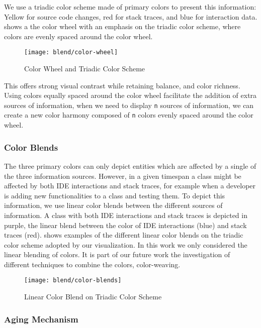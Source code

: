 We use a triadic color scheme made of primary colors to present this information: Yellow for source code changes, red for stack traces, and blue for interaction data.
 shows a the color wheel with an emphasis on the triadic color scheme, where colors are evenly spaced around the color wheel.

\begin{figure}[ht]
\centering
\texttt{[image: blend/color-wheel]}
\caption{Color Wheel and Triadic Color Scheme}
\label{fig:color-wheel}
\end{figure}

This offers strong visual contrast while retaining balance, and color richness.
Using colors equally spaced around the color wheel facilitate the addition of extra sources of information, \ie when we need to display \texttt{n} sources of information, we can create a new color harmony composed of \texttt{n} colors evenly spaced around the color wheel.


\subsubsection{Color Blends}

The three primary colors can only depict entities which are affected by a single of the three information sources.
However, in a given timespan a class might be affected by both IDE interactions and stack traces, for example when a developer is adding new functionalities to a class and testing them.
To depict this information, we use linear color blends between the different sources of information.
A class with both IDE interactions and stack traces is depicted in purple, the linear blend between the color of IDE interactions (\ie blue) and stack traces (\ie red).
 shows examples of the different linear color blends on the triadic color scheme adopted by our visualization.
In this work we only considered the linear blending of colors.
It is part of our future work the investigation of different techniques to combine the colors, \ie color-weaving.

\begin{figure}[ht]
\centering
\texttt{[image: blend/color-blends]}
\caption{Linear Color Blend on Triadic Color Scheme}
\label{fig:color-blends}
\end{figure}


\subsubsection{Aging Mechanism}

